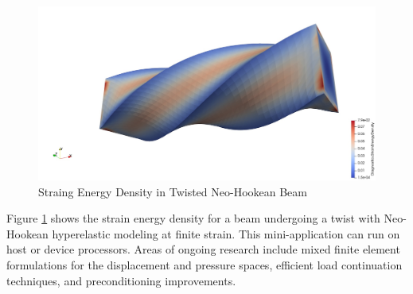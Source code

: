 \begin{figure}[ht!]
\includegraphics[width=.99\linewidth]{../img/SolidTwistExample}
\caption{Straing Energy Density in Twisted Neo-Hookean Beam}
\label{fig:solidtwist}
\end{figure}

Figure \ref{fig:solidtwist} shows the strain energy density for a beam undergoing a twist with Neo-Hookean hyperelastic modeling at finite strain.
This mini-application can run on host or device processors.
Areas of ongoing research include mixed finite element formulations for the displacement and pressure spaces, efficient load continuation techniques, and preconditioning improvements.
